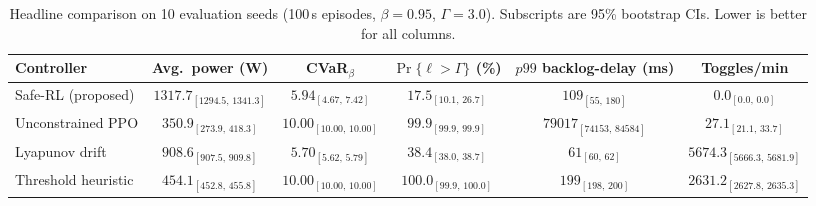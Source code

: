 \begin{table}[t]
  \centering
  \caption{Headline comparison on 10 evaluation seeds (100\,s episodes, $\beta=0.95$, $\Gamma=3.0$). Subscripts are 95\% bootstrap CIs. Lower is better for all columns.}
  \label{tab:headline}
  \small
  \begin{tabular}{lccccc}
    \toprule
    Controller & Avg.\ power (W) & CVaR$_{\beta}$ & $\Pr\{\ell>\Gamma\}$ (\%) & $p99$ backlog-delay (ms) & Toggles/min \\
    \midrule
    Safe-RL (proposed) & $1317.7_{[1294.5,\,1341.3]}$ & $5.94_{[4.67,\,7.42]}$ & $17.5_{[10.1,\,26.7]}$ & $109_{[55,\,180]}$ & $0.0_{[0.0,\,0.0]}$ \\
    Unconstrained PPO & $350.9_{[273.9,\,418.3]}$ & $10.00_{[10.00,\,10.00]}$ & $99.9_{[99.9,\,99.9]}$ & $79017_{[74153,\,84584]}$ & $27.1_{[21.1,\,33.7]}$ \\
    Lyapunov drift & $908.6_{[907.5,\,909.8]}$ & $5.70_{[5.62,\,5.79]}$ & $38.4_{[38.0,\,38.7]}$ & $61_{[60,\,62]}$ & $5674.3_{[5666.3,\,5681.9]}$ \\
    Threshold heuristic & $454.1_{[452.8,\,455.8]}$ & $10.00_{[10.00,\,10.00]}$ & $100.0_{[99.9,\,100.0]}$ & $199_{[198,\,200]}$ & $2631.2_{[2627.8,\,2635.3]}$ \\
    \bottomrule
  \end{tabular}
\end{table}
